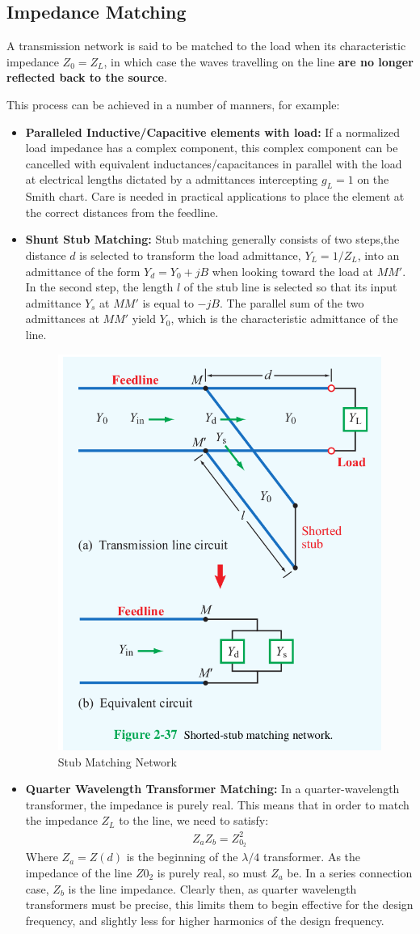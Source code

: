 \documentclass{book}
\begin{document}
\subsection{Impedance Matching}

A transmission network is said to be matched to the load when its characteristic impedance $Z_0 = Z_L$, in which case the waves travelling on the line \textbf{are no longer reflected back to the source}.

This process can be achieved in a number of manners, for example:

\begin{itemize}
	\item \textbf{Paralleled Inductive/Capacitive elements with load:} If a normalized load impedance has a complex component, this complex component can be cancelled with equivalent inductances/capacitances in parallel with the load at electrical lengths dictated by a admittances intercepting $g_L =1$ on the Smith chart. Care is needed in practical applications to place the element at the correct distances from the feedline. 
	\item \textbf{Shunt Stub Matching:} Stub matching generally consists of two steps,the distance $d$ is selected to transform the load admittance, $Y_L=1/Z_L$, into an admittance of the form $Y_d = Y_0 + jB$ when looking toward the load at $MM'$. In the second step, the length $l$ of the stub line is selected so that its input admittance $Y_s$ at $MM'$ is equal to $-jB$. The parallel sum of the two admittances at $MM'$ yield $Y_0$, which is the characteristic admittance of the line.
	\begin{figure}[h]
		\centering
		\includegraphics[width=0.4\linewidth]{Screenshots/stubmatching}
		\caption{Stub Matching Network}
		\label{fig:stubmatching}
	\end{figure}
	\item \textbf{Quarter Wavelength Transformer Matching:} In a quarter-wavelength transformer, the impedance is purely real. This means that in order to match the impedance $Z_L$ to the line, we need to satisfy:
	\begin{align*}
		Z_a Z_b = Z_{0_2}^2
	\end{align*}
	Where $Z_a=Z(d)$ is the beginning of the $\lambda/4$ transformer. As the impedance of the line $Z{0_2}$ is purely real, so must $Z_a$ be. In a series connection case, $Z_b$ is the line impedance. Clearly then, as quarter wavelength transformers must be precise, this limits them to begin effective for the design frequency, and slightly less for higher harmonics of the design frequency.
\end{itemize}
\end{document}
